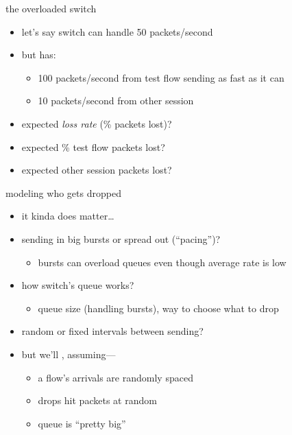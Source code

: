\begin{frame}{the overloaded switch}
\begin{itemize}
\item let's say switch can handle 50 packets/second
\item but has:
    \begin{itemize}
    \item 100 packets/second from test flow sending as fast as it can
    \item 10 packets/second from other session
    \end{itemize}
\item expected \textit{loss rate} (\% packets lost)?
\item expected \% test flow packets lost?
\item expected other session packets lost?
\end{itemize}
\end{frame}

\begin{frame}{modeling who gets dropped}
    \begin{itemize}
    \item it kinda does matter\ldots
    \item sending in big bursts or spread out (``pacing'')?
        \begin{itemize}
        \item bursts can overload queues even though average rate is low
        \end{itemize}
    \item how switch's queue works?
        \begin{itemize}
        \item queue size (handling bursts), way to choose what to drop
        \end{itemize}
    \item random or fixed intervals between sending?
    \vspace{.5cm}
    \item<2-> but we'll , assuming---
        \begin{itemize}
        \item a flow's arrivals are randomly spaced
        \item drops hit packets at random
        \item queue is ``pretty big''
        \end{itemize}
    \end{itemize}
\end{frame}

